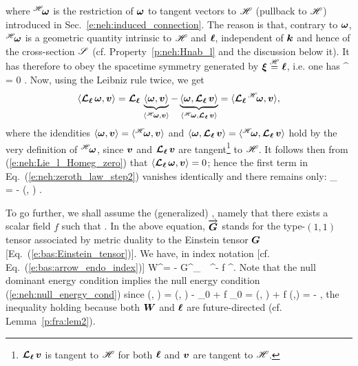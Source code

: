 where ${}^{\mathscr{H}}\!\bm{\omega}$ is the restriction of $\bm{\omega}$ to tangent vectors
to $\mathscr{H}$ (pullback to $\mathscr{H}$) introduced in Sec.~\ref{e:neh:induced_connection}.
The reason is that, contrary to $\bm{\omega}$,
${}^{\mathscr{H}}\!\bm{\omega}$ is a geometric quantity intrinsic to
$\mathscr{H}$ and $\bm{\ell}$, independent of $\bm{k}$ and hence of the cross-section $\mathscr{S}$
(cf. Property~\ref{p:neh:Hnab_l} and the discussion below it).
It has therefore to obey the spacetime symmetry generated by $\bm{\xi} \stackrel{\mathscr{H}}{=} \bm{\ell}$,
i.e. one has
\be \label{e:neh:Lie_l_Homeg_zero}
    \Lie{\el} {}^{\Hor}\!\w{\omega} = 0 .
\ee
Now, using the Leibniz rule twice, we get
\[
    \langle \bm{\mathcal{L}}_{\bm{\ell}}\, \bm{\omega}, \bm{v} \rangle = \bm{\mathcal{L}}_{\bm{\ell}}\,
    \underbrace{\langle \bm{\omega}, \bm{v} \rangle}_{\langle {}^{\mathscr{H}}\!\bm{\omega}, \bm{v} \rangle}
    - \underbrace{\langle \bm{\omega}, \bm{\mathcal{L}}_{\bm{\ell}}\, \bm{v} \rangle}_{\langle {}^{\mathscr{H}}\!\bm{\omega}, \bm{\mathcal{L}}_{\bm{\ell}}\, \bm{v} \rangle} = \langle \bm{\mathcal{L}}_{\bm{\ell}}\, {}^{\mathscr{H}}\!\bm{\omega}, \bm{v} \rangle ,
\]
where the idendities $\langle \bm{\omega}, \bm{v} \rangle = \langle {}^{\mathscr{H}}\!\bm{\omega}, \bm{v} \rangle$
and $\langle \bm{\omega}, \bm{\mathcal{L}}_{\bm{\ell}}\, \bm{v} \rangle =  \langle {}^{\mathscr{H}}\!\bm{\omega}, \bm{\mathcal{L}}_{\bm{\ell}}\, \bm{v} \rangle$
hold by the very definition of ${}^{\mathscr{H}}\!\bm{\omega}$,
since $\bm{v}$ and $\bm{\mathcal{L}}_{\bm{\ell}}\,\bm{v}$ are tangent\footnote{$\bm{\mathcal{L}}_{\bm{\ell}}\,\bm{v}$ is tangent to
$\mathscr{H}$ for both $\bm{\ell}$ and $\bm{v}$ are tangent to $\mathscr{H}$.}
to $\mathscr{H}$. It follows then from (\ref{e:neh:Lie_l_Homeg_zero}) that $\langle \bm{\mathcal{L}}_{\bm{\ell}}\, \bm{\omega}, \bm{v} \rangle = 0$; hence the
first term in Eq.~(\ref{e:neh:zeroth_law_step2}) vanishes identically and there remains
only:
\be \label{e:neh:DS_kappa_W}
    \wnab_{} \, \kappa = - (\wl, ) .
\ee

To go further, we shall assume the (generalized)
 \cite{Racz08}, namely that there
exists a scalar field $f$ such that
\be \label{e:neh:null_dominant_cond}
   .
\ee
In the above equation, $\overrightarrow{\bm{G}}$ stands for the type-$(1,1)$ tensor
associated by metric duality to the Einstein tensor
$\bm{G}$ [Eq.~(\ref{e:bas:Einstein_tensor})].
We have, in index notation [cf. Eq.~(\ref{e:bas:arrow_endo_index})]
\be \label{e:neh:def_W_index}
    W^\alpha = - G^\alpha_{\ \, \mu} \el^\mu - f \ell^\alpha .
\ee
Note that the null dominant energy condition implies the null energy condition
(\ref{e:neh:null_energy_cond}) since
\be \label{e:neh:R_ll_W_l}
    (\wl, \wl) = (\wl, \wl) -  _{0}
    + f _{0}  =  (\wl, \wl) + f (\wl,\wl)
     =  - \cdot\wl {} ,
\ee
the inequality holding because both $\bm{W}$ and $\bm{\ell}$ are future-directed
(cf. Lemma~\ref{p:fra:lem2}).

